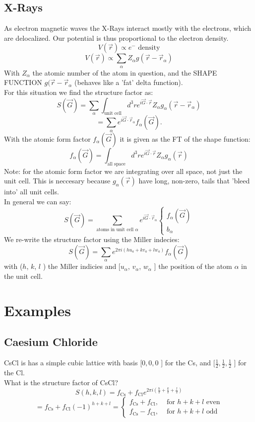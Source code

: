 \documentclass{report}
\begin{document}
\subsection{X-Rays}
As electron magnetic waves the X-Rays interact mostly with the electrons, which are delocalized. Our potential is thus proportional to the electron density. \[
	V(\vec{r}) \propto e^- \text{ density}
\] \[
V(\vec{r}) \propto \sum_{\alpha} Z_{\alpha} g\left( \vec{r} - \vec{r}_{\alpha} \right) 
\] With $Z_{\alpha}$ the atomic number of the atom in question, and the SHAPE FUNCTION $g(\vec{r} - \vec{r}_{\alpha}$ (behaves like a 'fat' delta function).\\
For this situation we find the structure factor as: \[
	S(\vec{G}) = \sum_{\alpha} \int_{\text{unit cell}} d^3r e^{i \vec{G} \cdot \vec{r}} Z_{\alpha} g_{\alpha}\left( \vec{r} - \vec{r}_{\alpha} \right) 
\] \[
= \sum_{\alpha} e^{i \vec{G} \cdot \vec{r}_{\alpha}} f_{\alpha}\left( \vec{G} \right) 
.\] With the atomic form factor $f_{\alpha}\left( \vec{G} \right) $ it is given as the FT of the shape function: \[
f_{\alpha}\left( \vec{G} \right)  = \int_{\text{all space}} d^3r e^{i \vec{G} \cdot \vec{r}} Z_{\alpha} g_{\alpha}(\vec{r})
\] Note: for the atomic form factor we are integrating over all space, not just the unit cell. This is neccesary because $g_{\alpha}(\vec{r})$ have long, non-zero, tails that 'bleed into' all unit cells. \\
In general we can say: \[
	S\left( \vec{G} \right) = \sum_{\text{atoms in unit cell }\alpha} e^{i \vec{G} \cdot \vec{r}_{\alpha}} \begin{cases}
			f_{\alpha}( \vec{G}) \\
			b_{\alpha}
	\end{cases}
\] We re-write the structure factor using the Miller indecies: \[
S\left( \vec{G} \right) = \sum_{\alpha} e^{2\pi i \left( h u_a + k v_a + l w_a  \right) } f_{\alpha}(\vec{G})
\] with ($h$, $k$, $l$ ) the Miller indicies and [$u_{\alpha}$, $v_{\alpha}$, $w_{\alpha}$ ] the position of the atom $\alpha$ in the unit cell.  
\section{Examples}
\subsection{Caesium Chloride}
CsCl is has a simple cubic lattice with basis [$0, 0, 0$ ] for the Cs, and [$\frac{1}{2}, \frac{1}{2}, \frac{1}{2}$ ] for the Cl.\\
What is the structure factor of CsCl? \[
			S\left( h, k, l \right) = f_{\text{Cs}}+ f_{\text{Cl}} e^{2\pi i \left( \frac{h}{2} + \frac{k}{2} + \frac{l}{2}  \right) }
	\] \[
	= f_{\text{Cs}} + f_{\text{Cl}} \left( -1 \right) ^{h+k+l} = \begin{cases}
		f_{\text{Cs}} + f_{\text{Cl}} , & \text{ for } h + k + l  \text{ even}\\
		f_{\text{Cs}} - f_{\text{Cl}} , & \text{ for } h + k + l \text{ odd}
	\end{cases}
	\]  
\end{document}

